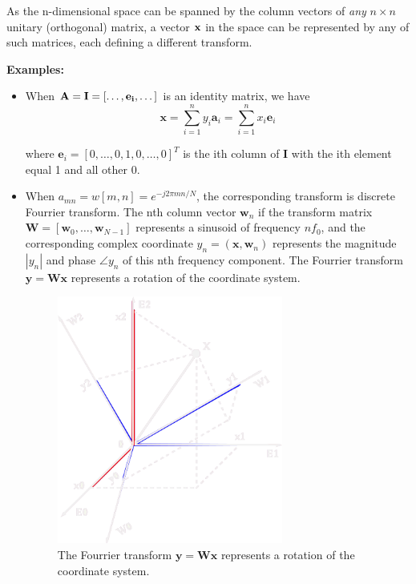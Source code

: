 \documentclass[10pt,b5paper,titlepage]{book}
\begin{document}
As the n-dimensional space can be spanned by the column vectors of
\textit{any} $n \times n$ unitary (orthogonal) matrix, a vector  $\bf{x}$
in the space can be represented by any of such matrices, each defining a different transform.

\textbf{Examples:}
\begin{itemize}
    \item When $\bf{A} = \mathbf{I} = [\dots, \mathbf{e}_i, \dots]$ is an identity matrix, we have
        \begin{equation}
            \mathbf{x} = \sum_{i=1}^{n} y_i \mathbf{a}_i = \sum_{i=1}^{n} x_i \mathbf{e}_i
        \end{equation}

        where $\mathbf{e}_i = [0, \dots, 0, 1, 0, \dots, 0]^{T}$ is the ith column of  $\mathbf{I}$ with the ith element equal 1 and all other 0.

    \item When $a_{mn} = w[m,n] = e^{-j 2 \pi m n / N}$, the corresponding
        transform is discrete Fourrier transform. The nth column vector
        $\mathbf{w}_n$ if the transform matrix
        $\mathbf{W} = [\mathbf{w}_0, \dots, \mathbf{w}_{N-1}]$
        represents a sinusoid of frequency  $n f_0$,
        and the corresponding complex coordinate
        $y_n = (\mathbf{x}, \mathbf{w}_n)$ represents the magnitude
        $|y_n|$ and phase $\angle y_n$
        of this nth frequency component. The Fourrier transform
        $\mathbf{y} = \mathbf{W} \mathbf{x}$ represents a rotation of the coordinate
        system.

        \begin{figure}[htpb]
            \centering
            \includegraphics[width=0.7\textwidth]{./img/unitary_transform_2_inv}
            \caption{The Fourrier transform $\mathbf{y} = \mathbf{W} \mathbf{x}$ represents a rotation of the coordinate system.}
            \label{fig:unitary_transform_2}
        \end{figure}


\end{itemize}
\end{document}
